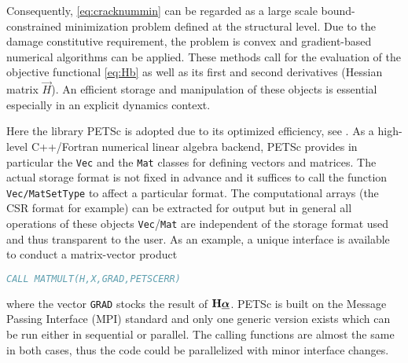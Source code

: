 Consequently, \eqref{eq:cracknummin} can be regarded as a large scale bound-constrained minimization problem defined at the structural level. Due to the damage constitutive requirement, the problem is convex and gradient-based numerical algorithms can be applied. These methods call for the evaluation of the objective functional \eqref{eq:Hb} as well as its first and second derivatives (Hessian matrix $\vec{H}$). An efficient storage and manipulation of these objects is essential especially in an explicit dynamics context.

Here the library PETSc is adopted due to its optimized efficiency, see \cite{PETSc:2015}. As a high-level C++/Fortran numerical linear algebra backend, PETSc provides in particular the \texttt{Vec} and the \texttt{Mat} classes for defining vectors and matrices. The actual storage format is not fixed in advance and it suffices to call the function \texttt{Vec/MatSetType} to affect a particular format. The computational arrays (the CSR format for example) can be extracted for output but in general all operations of these objects \texttt{Vec}/\texttt{Mat} are independent of the storage format used and thus transparent to the user. As an example, a unique interface is available to conduct a matrix-vector product
\begin{lstlisting}[language=Fortran]
CALL MATMULT(H,X,GRAD,PETSCERR)
\end{lstlisting}
where the vector \texttt{GRAD} stocks the result of $\vec{H}\dvec$. PETSc is built on the Message Passing Interface (MPI) standard and only one generic version exists which can be run either in sequential or parallel. The calling functions are almost the same in both cases, thus the code could be parallelized with minor interface changes.

